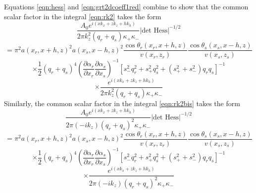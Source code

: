 Equations \ref{eqn:hess} and
\ref{eqn:grt2dcoeff1red} combine to show that the common scalar factor in
the integral \ref{eqn:rk2} takes the form
\[
\frac{A_0 e^{i(xk_{x}+zk_{z}+hk_{h})}}{2\pi 
  k^2_z(q_r + q_s)\kappa_+\kappa_-} |\mbox{det Hess}|^{-1/2} 
\]
\[
=\pi^2 a(x_r,x+h,z)^2  a(x_s,x-h,z)^2 
 \frac{\cos \theta_r(x_r,x+h,z)}{v(x_r,z_r)}
\frac{\cos\theta_s(x_s,x-h,z)}{v(x_s,z_s)} 
\]
\[
\times \frac{1}{2} (q_r+q_s)^4\left(\frac{\partial 
    \alpha_r}{\partial x_r}\frac{\partial \alpha_s}{\partial 
    x_s}\right)^{-1}[s_-^2q_r^2 + s_+^2q_s^2 +
(s_+^2+s_-^2)q_rq_s]^{-1}
\]
\begin{equation}
\label{eqn:rk3}
\times \frac{e^{i(xk_{x}+zk_{z}+hk_{h})}}{2\pi 
  k^2_z(q_r + q_s)\kappa_+\kappa_-} 
\end{equation}
Similarly,  the common scalar factor in
the integral \ref{eqn:rk2bis} takes the form
\[
\frac{A_0 e^{i(xk_{x}+zk_{z}+hk_{h})}}{2\pi 
  (-ik_z)(q_r + q_s)^2\kappa_+\kappa_-} |\mbox{det Hess}|^{-1/2} 
\]
\[
=\pi^2 a(x_r,x+h,z)^2  a(x_s,x-h,z)^2 
 \frac{\cos \theta_r(x_r,x+h,z)}{v(x_r,z_r)}
\frac{\cos\theta_s(x_s,x-h,z)}{v(x_s,z_s)} 
\]
\[
\times \frac{1}{2} (q_r+q_s)^4\left(\frac{\partial 
    \alpha_r}{\partial x_r}\frac{\partial \alpha_s}{\partial 
    x_s}\right)^{-1}[s_-^2q_r^2 + s_+^2q_s^2 +
(s_+^2+s_-^2)q_rq_s]^{-1}
\]
\begin{equation}
\label{eqn:rk3bis}
\times \frac{e^{i(xk_{x}+zk_{z}+hk_{h})}}{2\pi 
  (-ik_z)(q_r + q_s)^2\kappa_+\kappa_-} 
\end{equation}

